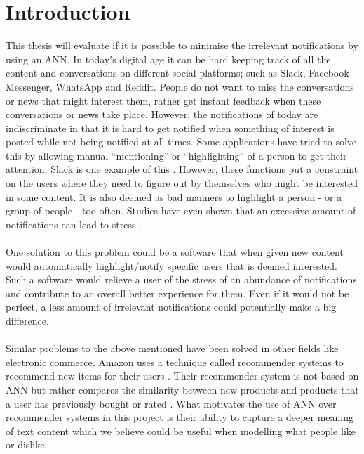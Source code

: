 \chapter{Introduction}

This thesis will evaluate if it is possible to minimise the irrelevant notifications by using an ANN. In today’s digital age it can be hard keeping track of all the content and conversations on different social platforms; such as Slack, Facebook Messenger, WhatsApp and Reddit. People do not want to miss the conversations or news that might interest them, rather get instant feedback when these conversations or news take place. However, the notifications of today are indiscriminate in that it is hard to get notified when something of interest is posted while not being notified at all times. Some applications have tried to solve this by allowing manual “mentioning” or “highlighting” of a person to get their attention; Slack is one example of this \parencite{slack}. However, these functions put a constraint on the users where they need to figure out by themselves who might be interested in some content. It is also deemed as bad manners to highlight a person - or a group of people - too often. Studies have even shown that an excessive amount of notifications can lead to stress \parencite{relaffinity}.
\\\\
One solution to this problem could be a software that when given new content would automatically highlight/notify specific users that is deemed interested. Such a software would relieve a user of the stress of an abundance of notifications and contribute to an overall better experience for them. Even if it would not be perfect, a less amount of irrelevant notifications could potentially make a big difference.
\\\\
Similar problems to the above mentioned have been solved in other fields like electronic commerce. Amazon uses a technique called recommender systems to recommend new items for their users \parencite{amazonfiltering}. Their recommender system is not based on ANN but rather compares the similarity between new products and products that a user has previously bought or rated \parencite{amazonfiltering}. What motivates the use of ANN over recommender systems in this project is their ability to capture a deeper meaning of text content which we believe could be useful when modelling what people like or dislike. 

